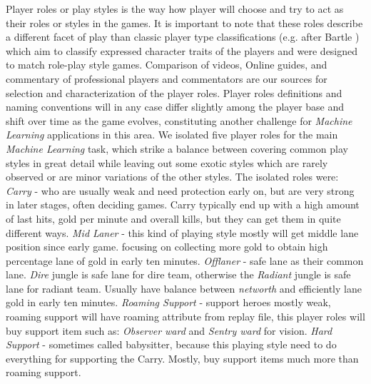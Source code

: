 Player roles or play styles is the way how player will choose and try to act as their roles or styles in the games. It is important to note that these roles describe a different facet of play than classic player type classifications (e.g. after Bartle \cite{bartle1996hearts}) which aim to classify expressed character traits of the players and were designed to match role-play style games. Comparison of videos, Online guides, and commentary of professional players and commentators are our sources for selection and characterization of the player roles. Player roles definitions and naming conventions will in any case differ slightly among the player base and shift over time as the game evolves, constituting another challenge for \textit{Machine Learning} applications in this area. We isolated five player roles for the main \textit{Machine Learning} task, which strike a balance between covering common play styles in great detail while leaving out some exotic styles which are rarely observed or are minor variations of the other styles. The isolated roles were: \textit{Carry} - who are usually weak and need protection early on, but are very strong in later stages, often deciding games. Carry typically end up with a high amount of last hits, gold per minute and overall kills, but they can get them in quite different ways. \textit{Mid Laner} - this kind of playing style mostly will get middle lane position since early game. focusing on collecting more gold to obtain high percentage lane of gold in early ten minutes. \textit{Offlaner} - safe lane as their common lane. \textit{Dire} jungle is safe lane for dire team, otherwise the \textit{Radiant} jungle is safe lane for radiant team. Usually have balance between \textit{networth} and efficiently lane gold in early ten minutes. \textit{Roaming Support} - support heroes mostly weak, roaming support will have roaming attribute from replay file, this player roles will buy support item such as: \textit{Observer ward} and \textit{Sentry ward} for vision. \textit{Hard Support} - sometimes called babysitter, because this playing style need to do everything for supporting the Carry. Mostly, buy support items much more than roaming support.
